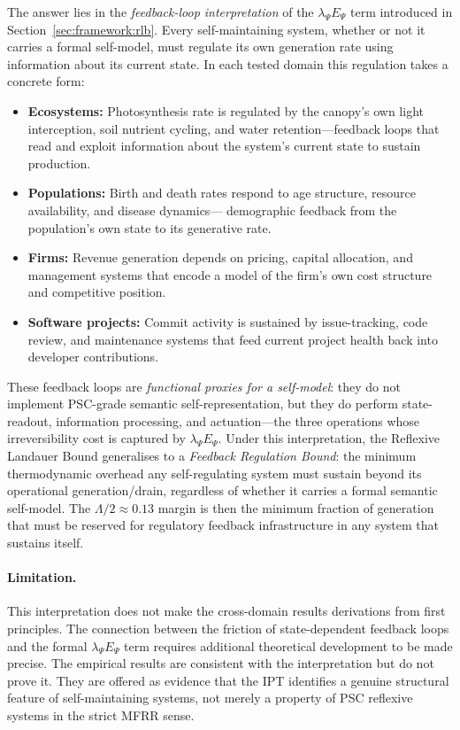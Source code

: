 \documentclass[11pt,twocolumn]{article}
\theoremstyle{remark}
\begin{document}
The answer lies in the \emph{feedback-loop interpretation} of the
$\lambda_\Psi E_\Psi$ term introduced in Section~\ref{sec:framework:rlb}.
Every self-maintaining system, whether or not it carries a formal
self-model, must regulate its own generation rate using information
about its current state. In each tested domain this regulation takes
a concrete form:
\begin{itemize}
  \item \textbf{Ecosystems:} Photosynthesis rate is regulated by the
    canopy's own light interception, soil nutrient cycling, and
    water retention---feedback loops that read and exploit
    information about the system's current state to sustain production.
  \item \textbf{Populations:} Birth and death rates respond to
    age structure, resource availability, and disease dynamics---
    demographic feedback from the population's own state to its
    generative rate.
  \item \textbf{Firms:} Revenue generation depends on pricing,
    capital allocation, and management systems that encode a model
    of the firm's own cost structure and competitive position.
  \item \textbf{Software projects:} Commit activity is sustained by
    issue-tracking, code review, and maintenance systems that feed
    current project health back into developer contributions.
\end{itemize}
These feedback loops are \emph{functional proxies for a self-model}:
they do not implement PSC-grade semantic self-representation, but they
do perform state-readout, information processing, and actuation---the
three operations whose irreversibility cost is captured by
$\lambda_\Psi E_\Psi$. Under this interpretation, the Reflexive
Landauer Bound generalises to a \emph{Feedback Regulation Bound}: the
minimum thermodynamic overhead any self-regulating system must sustain
beyond its operational generation/drain, regardless of whether it
carries a formal semantic self-model. The $\Lambda/2 \approx 0.13$
margin is then the minimum fraction of generation that must be
reserved for regulatory feedback infrastructure in any system
that sustains itself.

\paragraph{Limitation.}
This interpretation does not make the cross-domain results derivations
from first principles. The connection between the friction of
state-dependent feedback loops and the formal $\lambda_\Psi E_\Psi$
term requires additional theoretical development to be made precise.
The empirical results are consistent with the interpretation but do not
prove it. They are offered as evidence that the IPT identifies a
genuine structural feature of self-maintaining systems, not merely a
property of PSC reflexive systems in the strict MFRR sense.
\end{document}
